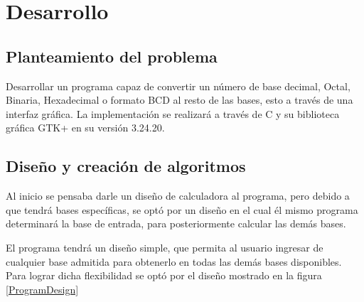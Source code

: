 \documentclass[letterpaper,12pt]{extarticle}%
\begin{document}
\begin{multicols}{2}
\begin{enumerate}
	\end{enumerate} 

    
		
	\section{Desarrollo}
	\subsection{Planteamiento del problema}
		Desarrollar un programa capaz de convertir un número de base decimal,
		Octal, Binaria, Hexadecimal o formato BCD al resto de las bases, esto
		a través de una interfaz	gráfica. La implementación se realizará a 	  	   		través de C y su biblioteca gráfica GTK+ en su versión 3.24.20.

	\subsection{Diseño y creación de algoritmos}
		Al inicio se pensaba darle un diseño de calculadora al programa, pero 
		debido a que tendrá bases específicas, se optó por un diseño en el cual él 
		mismo programa determinará la base de entrada, para posteriormente 			    	calcular las demás bases.

		El programa tendrá un diseño simple, que permita al usuario ingresar
		de cualquier base admitida para obtenerlo en todas las demás bases 
		disponibles. Para lograr dicha flexibilidad se optó por el diseño
		mostrado en la figura \ref{ProgramDesign}


\end{multicols}
\end{document}
